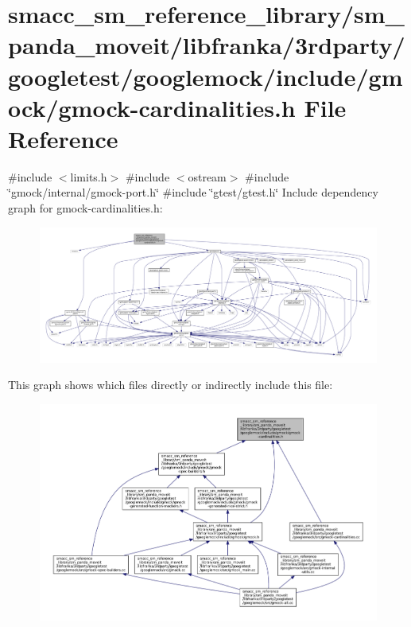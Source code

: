 \hypertarget{gmock-cardinalities_8h}{}\section{smacc\+\_\+sm\+\_\+reference\+\_\+library/sm\+\_\+panda\+\_\+moveit/libfranka/3rdparty/googletest/googlemock/include/gmock/gmock-\/cardinalities.h File Reference}
\label{gmock-cardinalities_8h}
{\ttfamily \#include $<$limits.\+h$>$}\newline
{\ttfamily \#include $<$ostream$>$}\newline
{\ttfamily \#include \char`\"{}gmock/internal/gmock-\/port.\+h\char`\"{}}\newline
{\ttfamily \#include \char`\"{}gtest/gtest.\+h\char`\"{}}\newline
Include dependency graph for gmock-\/cardinalities.h\+:
\nopagebreak
\begin{figure}[H]
\begin{center}
\leavevmode
\includegraphics[width=350pt]{gmock-cardinalities_8h__incl}
\end{center}
\end{figure}
This graph shows which files directly or indirectly include this file\+:
\nopagebreak
\begin{figure}[H]
\begin{center}
\leavevmode
\includegraphics[width=350pt]{gmock-cardinalities_8h__dep__incl}
\end{center}
\end{figure}
